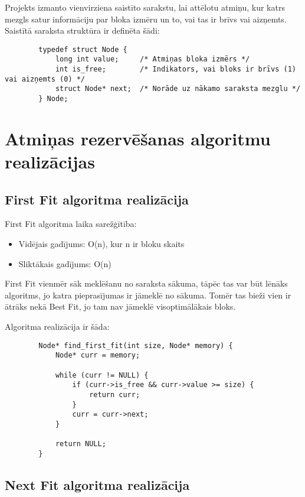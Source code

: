 \documentclass{report}
\begin{document}
	Projekts izmanto vienvirziena saistīto sarakstu, lai attēlotu atmiņu, kur katrs mezgls satur informāciju par bloka izmēru un to, vai tas ir brīvs vai aizņemts. Saistītā saraksta struktūra ir definēta šādi:
	
	\begin{verbatim}
		typedef struct Node {
			long int value;     /* Atmiņas bloka izmērs */
			int is_free;        /* Indikators, vai bloks ir brīvs (1) vai aizņemts (0) */
			struct Node* next;  /* Norāde uz nākamo saraksta mezglu */
		} Node;
	\end{verbatim}
	
	\section{Atmiņas rezervēšanas algoritmu realizācijas}
	
	\subsection{First Fit algoritma realizācija}
	
	First Fit algoritma laika sarežģītība:
	\begin{itemize}
		\item Vidējais gadījums: O(n), kur n ir bloku skaits
		\item Sliktākais gadījums: O(n)
	\end{itemize}
	
	First Fit vienmēr sāk meklēšanu no saraksta sākuma, tāpēc tas var būt lēnāks algoritms, jo katra pieprasījumas ir jāmeklē no sākuma. Tomēr tas bieži vien ir ātrāks nekā Best Fit, jo tam nav jāmeklē visoptimālākais bloks.
	
	Algoritma realizācija ir šāda:
	
	\begin{verbatim}
		Node* find_first_fit(int size, Node* memory) {
			Node* curr = memory;
			
			while (curr != NULL) {
				if (curr->is_free && curr->value >= size) {
					return curr;
				}
				curr = curr->next;
			}
			
			return NULL; 
		}
	\end{verbatim}
	
	\subsection{Next Fit algoritma realizācija}
	
\end{document}
